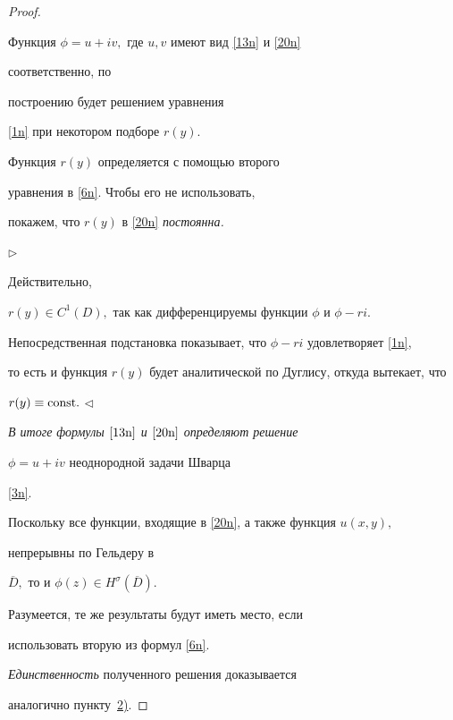 \begin{proof}
\begin{equation}
\label{20n}

\end{equation}



Функция $\phi=u+iv,$ где $u,v$ имеют вид \eqref{13n} и \eqref{20n}

 соответственно, по

 построению будет решением уравнения

 \eqref{1n} при некотором подборе  $r(y).$

 Функция $r(y)$ определяется с помощью второго

уравнения в \eqref{6n}. Чтобы его не использовать,

покажем, что  $r(y)$ в \eqref{20n} {\it постоянна.}



\smallskip



$\triangleright$

Действительно,

 $r(y)\in C^1(D),$ так как дифференцируемы функции $\phi$ и $\phi-ri.$

Непосредственная подстановка показывает, что $\phi-ri$ удовлетворяет \eqref{1n},

то есть и функция $r(y)$ будет аналитической по Дуглису, откуда вытекает, что

 $r(y)\equiv\rm{const}.$ $\triangleleft$



\smallskip



{\it В итоге  формулы  $\eqref{13n}$ и $\eqref{20n}$ определяют  решение

$\phi=u+iv$ неоднородной задачи Шварца } \eqref{3n}.



Поскольку все функции, входящие  в \eqref{20n}, а  также функция $u(x,y),$

непрерывны по Гельдеру в

$\overline{D},$ то и $\phi(z)\in H^\sigma(\overline{D}).$

Разумеется, те же результаты будут иметь место, если

использовать вторую  из формул \eqref{6n}.



 {\it Единственность} полученного решения доказывается

 аналогично  пункту~\hyperlink{nik:th4-2}{2)}.

\end{proof}





